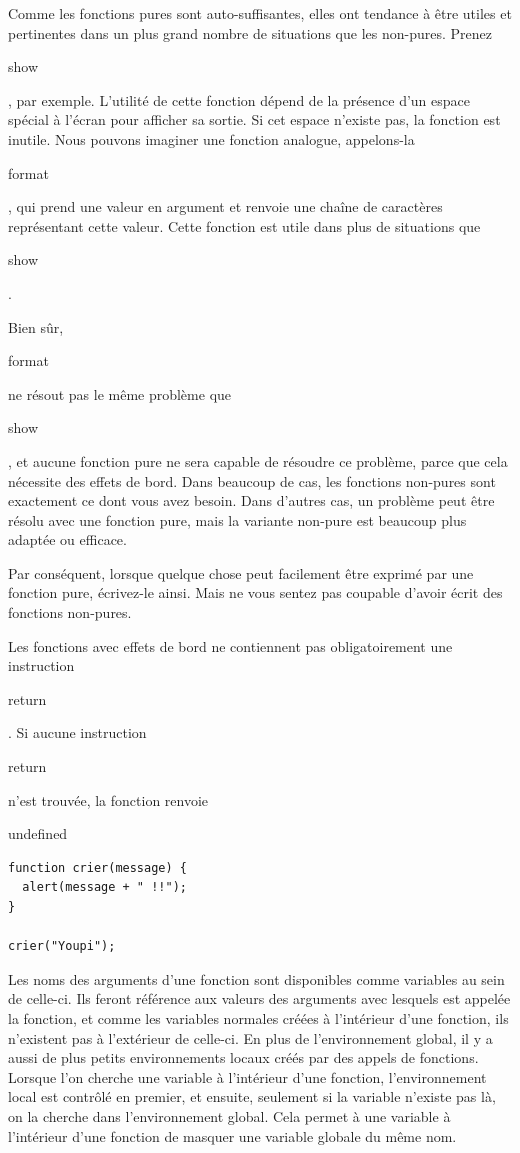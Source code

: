 \documentclass{FramateX}
\renewcommand{\texttt}[1]{\begin{sffamily}{#1}\end{sffamily}}
\begin{document}
Comme les fonctions pures sont auto-suffisantes, elles ont tendance à
être utiles et pertinentes dans un plus grand nombre de situations que
les non-pures. Prenez \texttt{show}, par exemple. L'utilité de cette
fonction dépend de la présence d'un espace spécial à l'écran pour
afficher sa sortie. Si cet espace n'existe pas, la fonction est inutile.
Nous pouvons imaginer une fonction analogue, appelons-la
\texttt{format}, qui prend une valeur en argument et renvoie une chaîne
de caractères représentant cette valeur. Cette fonction est utile dans
plus de situations que \texttt{show}.

Bien sûr, \texttt{format} ne résout pas le même problème que
\texttt{show}, et aucune fonction pure ne sera capable de résoudre ce
problème, parce que cela nécessite des effets de bord. Dans beaucoup de
cas, les fonctions non-pures sont exactement ce dont vous avez besoin.
Dans d'autres cas, un problème peut être résolu avec une fonction pure,
mais la variante non-pure est beaucoup plus adaptée ou efficace.

Par conséquent, lorsque quelque chose peut facilement être exprimé par
une fonction pure, écrivez-le ainsi. Mais ne vous sentez pas coupable
d'avoir écrit des fonctions non-pures.

\begin{center}\end{center}

Les fonctions avec effets de bord ne contiennent pas obligatoirement une
instruction \texttt{return}. Si aucune instruction \texttt{return} n'est
trouvée, la fonction renvoie \texttt{undefined}

\begin{lstlisting}
function crier(message) {
  alert(message + " !!");
}

crier("Youpi");
\end{lstlisting}
\begin{center}\end{center}

Les noms des arguments d'une fonction sont disponibles comme variables
au sein de celle-ci. Ils feront référence aux valeurs des arguments avec
lesquels est appelée la fonction, et comme les variables normales créées
à l'intérieur d'une fonction, ils n'existent pas à l'extérieur de
celle-ci. En plus de l'environnement global, il y a aussi de plus petits
environnements locaux créés par des appels de fonctions. Lorsque l'on
cherche une variable à l'intérieur d'une fonction, l'environnement local
est contrôlé en premier, et ensuite, seulement si la variable n'existe
pas là, on la cherche dans l'environnement global. Cela permet à une
variable à l'intérieur d'une fonction de masquer une variable globale du
même nom.
\end{document}
